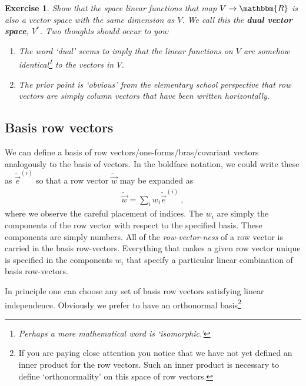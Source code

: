 \documentclass[
  11pt,
	colorful,
	raggedright,
]{tufte-style-thesis-flip}
\newtheorem{exercise}{Exercise}[section]
\begin{document}
\begin{exercise}
Show that the space linear functions that map $V\to \mathbbm{R}$ is also a vector space with the same dimension as $V$. We call this the \textbf{dual vector space}, $V^*$. Two thoughts should occur to you:
\begin{enumerate}
  \item The word `dual' seems to imply that the linear functions on $V$  are somehow identical\footnote{Perhaps a more mathematical word is `isomorphic.'} to the vectors in $V$.
  \item The prior point is `obvious' from the elementary school perspective that row vectors are simply column vectors that have been written horizontally.
\end{enumerate}
\end{exercise}



\subsection{Basis row vectors}

We can define a basis of row vectors/one-forms/bras/covariant vectors analogously to the basis of vectors. In the boldface notation, we could write these as $\tilde{\vec{e}}^{(i)}$ so that a row vector $\tilde{\vec w}$ may be expanded as
\begin{align}
 \tilde{\vec w} = \sum_i w_i \tilde{\vec{e}}^{(i)} \ ,
\end{align}
where we observe the careful placement of indices. The $w_i$ are simply the components of the row vector with respect to the specified basis. These components are simply numbers. All of the \emph{row-vector-ness} of a row vector is carried in the basis row-vectors. Everything that makes a given row vector unique is specified in the components $w_i$ that specify a particular linear combination of basis row-vectors.

In principle one can choose any set of basis row vectors satisfying linear independence. Obviously we prefer to have an orthonormal basis\footnote{If you are paying close attention you notice that we have not yet defined an inner product for the row vectors. Such an inner product is necessary to define `orthonormality' on this space of row vectors.}
\end{document}
